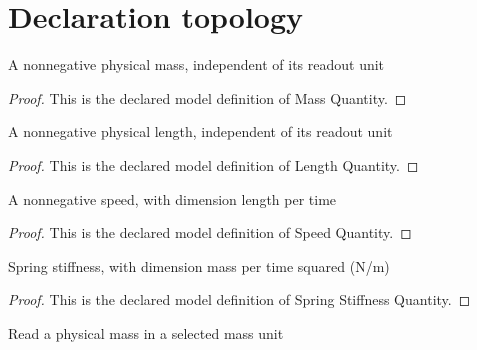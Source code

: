 \section{Declaration topology}
\begin{definition}
  \label{def:physics:phyx-mini-0202:phyxminiproblems-problemphyxmini0202-massquantity}
  A nonnegative physical mass, independent of its readout unit
\end{definition}
\begin{proof}
  This is the declared model definition of Mass Quantity.
\end{proof}
\begin{definition}
  \label{def:physics:phyx-mini-0202:phyxminiproblems-problemphyxmini0202-lengthquantity}
  A nonnegative physical length, independent of its readout unit
\end{definition}
\begin{proof}
  This is the declared model definition of Length Quantity.
\end{proof}
\begin{definition}
  \label{def:physics:phyx-mini-0202:phyxminiproblems-problemphyxmini0202-speedquantity}
  A nonnegative speed, with dimension length per time
\end{definition}
\begin{proof}
  This is the declared model definition of Speed Quantity.
\end{proof}
\begin{definition}
  \label{def:physics:phyx-mini-0202:phyxminiproblems-problemphyxmini0202-springstiffnessquantity}
  Spring stiffness, with dimension mass per time squared (N/m)
\end{definition}
\begin{proof}
  This is the declared model definition of Spring Stiffness Quantity.
\end{proof}
\begin{definition}
  \label{def:physics:phyx-mini-0202:phyxminiproblems-problemphyxmini0202-massreadout}
  Read a physical mass in a selected mass unit
\end{definition}
